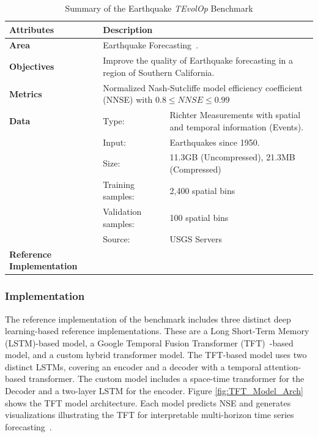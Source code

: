 \documentclass[utf8]{FrontiersinVancouver} %
\begin{document}
\begin{table}
\caption{Summary of the Earthquake {\em TEvolOp} Benchmark}\label{tab:eq-summary}
\begin{center}
  {\footnotesize
\begin{tabular}{|p{}p{}p{}|}
\hline
{\bf Attributes} & {\bf Description} \\
\hline
\hline
{\bf Area} & \multicolumn{2}{l|}{Earthquake Forecasting~\citep{fox2022-jm,TFT-21,eq-code,eq-data}.}\\
\hline
{\bf Objectives} &  \multicolumn{2}{l|}{Improve the quality of Earthquake
forecasting in a region of Southern California.}\\
\hline
{\bf Metrics} & \multicolumn{2}{l|}{Normalized Nash-Sutcliffe model efficiency coefficient (NNSE) with $0.8\leq NNSE\leq 0.99$}\\
\hline
{\bf Data}  & Type:  & Richter Measurements with spatial and temporal information (Events). \\
  &  Input:  & Earthquakes since 1950.\\
  &  Size:  & 11.3GB (Uncompressed), 21.3MB (Compressed)\\
  & Training samples: & 2,400 spatial bins\\
  & Validation samples:  &  100 spatial bins\\
  & Source:  & USGS Servers~\citep{eq-data}\\
\hline
{\bf Reference Implementation} & \citep{eq-code} & \\
\hline
\end{tabular}
}
\end{center}
\end{table}


\subsubsection{Implementation}

The reference implementation of the benchmark includes three distinct deep learning-based reference implementations. These are a Long Short-Term Memory (LSTM)-based model, a Google Temporal Fusion Transformer (TFT)~\citep{TFT-21}-based model, and a custom hybrid transformer model. The TFT-based model uses two distinct LSTMs, covering an encoder and a decoder with a temporal attention-based transformer. The custom model includes a space-time transformer for the Decoder and a two-layer LSTM for the encoder. Figure \ref{fig:TFT_Model_Arch} shows the TFT model architecture. Each model predicts NSE and generates visualizations illustrating the TFT for interpretable multi-horizon time series forecasting~\citep{TFT-21}.
\end{document}
